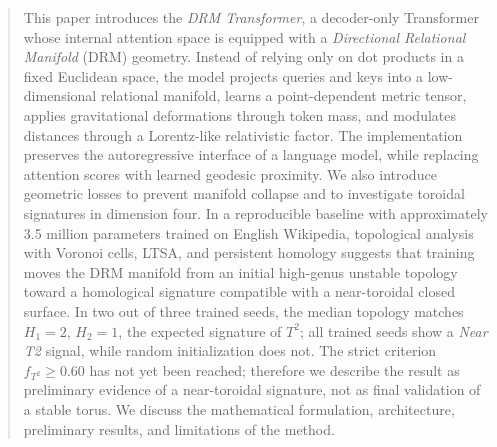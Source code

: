 \begin{abstract}
This paper introduces the \emph{DRM Transformer}, a decoder-only Transformer
whose internal attention space is equipped with a \emph{Directional Relational
Manifold} (DRM) geometry. Instead of relying only on dot products in a fixed
Euclidean space, the model projects queries and keys into a low-dimensional
relational manifold, learns a point-dependent metric tensor, applies
gravitational deformations through token mass, and modulates distances through
a Lorentz-like relativistic factor. The implementation preserves the
autoregressive interface of a language model, while replacing attention scores
with learned geodesic proximity. We also introduce geometric losses to prevent
manifold collapse and to investigate toroidal signatures in dimension four. In
a reproducible baseline with approximately 3.5 million parameters trained on
English Wikipedia, topological analysis with Voronoi cells, LTSA, and
persistent homology suggests that training moves the DRM manifold from an
initial high-genus unstable topology toward a homological signature compatible
with a near-toroidal closed surface. In two out of three trained seeds, the
median topology matches $H_1=2$, $H_2=1$, the expected signature of $T^2$; all
trained seeds show a \emph{Near T2} signal, while random initialization does
not. The strict criterion $f_{T^2}\geq 0.60$ has not yet been reached; therefore
we describe the result as preliminary evidence of a near-toroidal signature,
not as final validation of a stable torus. We discuss the mathematical
formulation, architecture, preliminary results, and limitations of the method.
\end{abstract}
